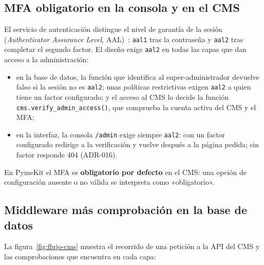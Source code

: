 \subsection{MFA obligatorio en la consola y en el CMS}

El servicio de autenticación distingue el nivel de garantía de la sesión
(\textit{Authenticator Assurance Level}, AAL)~\cite{supabase-mfa}:
\texttt{aal1} tras la contraseña y \texttt{aal2} tras completar el segundo
factor. El diseño exige \texttt{aal2} en todas las capas que dan acceso a la
administración:

\begin{itemize}
  \item en la base de datos, la función que identifica al super-administrador
        devuelve falso si la sesión no es \texttt{aal2}; unas políticas
        restrictivas exigen \texttt{aal2} a quien tiene un factor configurado;
        y el acceso al CMS lo decide la función
        \texttt{cms.verify\_admin\_access()}, que comprueba la cuenta activa
        del CMS y el MFA;
  \item en la interfaz, la consola \texttt{/admin} exige siempre
        \texttt{aal2}: con un factor configurado redirige a la verificación y
        vuelve después a la página pedida; sin factor responde 404 (ADR-016).
\end{itemize}

En PymeKit el MFA es \textbf{obligatorio por defecto} en el CMS: una opción
de configuración ausente o no válida se interpreta como «obligatorio».

\subsection{Middleware más comprobación en la base de datos}

La figura~\ref{fig:flujo-cms} muestra el recorrido de una petición a la API
del CMS y las comprobaciones que encuentra en cada capa:

